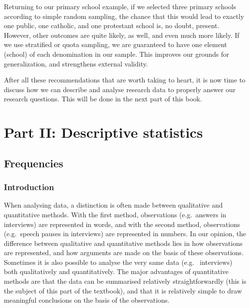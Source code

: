 \documentclass[
]{book}
\begin{document}
Returning to our primary school example, if we selected three primary schools according to simple random sampling, the chance that this would lead to exactly one public, one catholic, and one protestant school is, no doubt, present. However, other outcomes are quite likely, as well, and even much more likely. If we use stratified or quota sampling, we are guaranteed to have one element (school) of each denomination in our sample. This improves our grounds for generalization, and strengthens external validity.

After all these recommendations that are worth taking to heart, it is now time to discuss how we can describe and analyse research data to properly answer our research questions. This will be done in the next part of this book.

\hypertarget{part-part-ii-descriptive-statistics}{%
\part*{Part II: Descriptive statistics}\label{part-part-ii-descriptive-statistics}}

\hypertarget{ch-frequencies}{%
\chapter{Frequencies}\label{ch-frequencies}}

\hypertarget{introduction-3}{%
\section{Introduction}\label{introduction-3}}

When analysing data, a distinction is often made between
qualitative and quantitative methods. With the first method,
observations (e.g.~answers in interviews) are represented in
words, and with the second method, observations (e.g.~speech
pauses in interviews) are represented in numbers. In our opinion,
the difference between qualitative and quantitative methods
lies in how observations are represented, and
how arguments are made on the basis of these observations.
Sometimes it is also possible to analyse the very same data (e.g.~
interviews) both qualitatively and quantitatively. The major
advantages of quantitative methods are that the data can be summarised
relatively straightforwardly (this is the subject of this part of the
textbook), and that it is relatively simple to draw meaningful conclusions
on the basis of the observations.
\end{document}
